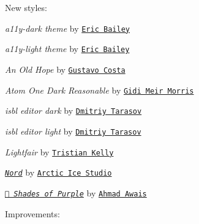 New styles\+:


\begin{DoxyItemize}
\item {\itshape a11y-\/dark theme} by \href{https://github.com/ericwbailey}{\tt Eric Bailey}
\item {\itshape a11y-\/light theme} by \href{https://github.com/ericwbailey}{\tt Eric Bailey}
\item {\itshape An Old Hope} by \href{https://github.com/gusbemacbe}{\tt Gustavo Costa}
\item {\itshape Atom One Dark Reasonable} by \href{https://github.com/gmmorris}{\tt Gidi Meir Morris}
\item {\itshape isbl editor dark} by \href{https://github.com/MedvedTMN}{\tt Dmitriy Tarasov}
\item {\itshape isbl editor light} by \href{https://github.com/MedvedTMN}{\tt Dmitriy Tarasov}
\item {\itshape Lightfair} by \href{https://github.com/TristianK3604}{\tt Tristian Kelly}
\item \href{https://github.com/arcticicestudio/nord-highlightjs}{\tt {\itshape Nord}} by \href{https://github.com/arcticicestudio}{\tt Arctic Ice Studio}
\item {\itshape \href{https://github.com/ahmadawais/Shades-of-Purple-HighlightJS}{\tt 🦄 Shades of Purple}} by \href{https://github.com/ahmadawais}{\tt Ahmad Awais}
\end{DoxyItemize}

Improvements\+:


